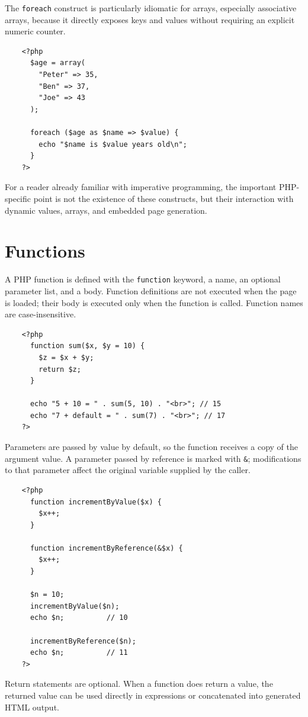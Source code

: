 \documentclass{scrbook}
\begin{document}
	The \texttt{foreach} construct is particularly idiomatic for arrays, especially associative arrays, because it directly exposes keys and values without requiring an explicit numeric counter.
	
	\begin{lstlisting}
	<?php
	  $age = array(
		"Peter" => 35,
		"Ben" => 37,
		"Joe" => 43
	  );
		
	  foreach ($age as $name => $value) {
		echo "$name is $value years old\n";
	  }
	?>
	\end{lstlisting}
	
	For a reader already familiar with imperative programming, the important PHP-specific point is not the existence of these constructs, but their interaction with dynamic values, arrays, and embedded page generation.
	
	\section{Functions}
	
	A PHP function is defined with the \texttt{function} keyword, a name, an optional parameter list, and a body. Function definitions are not executed when the page is loaded; their body is executed only when the function is called. Function names are case-insensitive.
	
	\begin{lstlisting}
	<?php
	  function sum($x, $y = 10) {
		$z = $x + $y;
		return $z;
	  }
		
	  echo "5 + 10 = " . sum(5, 10) . "<br>"; // 15
	  echo "7 + default = " . sum(7) . "<br>"; // 17
	?>
	\end{lstlisting}
	
	Parameters are passed by value by default, so the function receives a copy of the argument value. A parameter passed by reference is marked with \texttt{\&}; modifications to that parameter affect the original variable supplied by the caller.
	
	\begin{lstlisting}
	<?php
	  function incrementByValue($x) {
		$x++;
	  }
		
	  function incrementByReference(&$x) {
		$x++;
	  }
		
	  $n = 10;
	  incrementByValue($n);
	  echo $n;          // 10
		
	  incrementByReference($n);
	  echo $n;          // 11
	?>
	\end{lstlisting}
	
	Return statements are optional. When a function does return a value, the returned value can be used directly in expressions or concatenated into generated HTML output.\\
	
\end{document}
